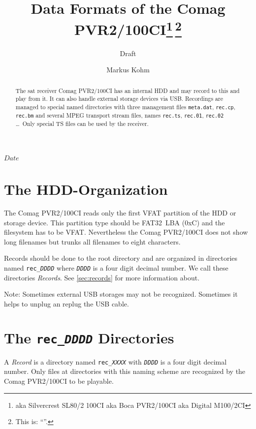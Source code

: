 \documentclass{scrartcl}
\newcommand*{\Comag}{Comag PVR2/100CI\xspace}
\newcommand*{\Silvercrest}{Silvercrest SL80/2 100CI\xspace}
\newcommand*{\Boca}{Boca PVR2/100CI\xspace}
\newcommand*{\Digital}{Digital M100/2CI\xspace}
\begin{document}
\pdfbookmark[1]{\Comag}{title}
\title{Data Formats of the \Comag\footnote{aka
    \Silvercrest aka \Boca aka \Digital}\,\footnote{This is: ``\SVNId''.}}
\subtitle{Draft}
\author{Markus Kohm}
\SVNdate $Date$
\maketitle
\begin{abstract}
  The sat receiver \Comag has an internal HDD and may record to this and play
  from it. It can also handle external storage devices via USB. Recordings are
  managed to special named directories with three management files
  \texttt{meta.dat}, \texttt{rec.cp}, \texttt{rec.bm} and several MPEG
  transport stream files, names \texttt{rec.ts}, \texttt{rec.01},
  \texttt{rec.02} \dots\@\ Only special TS files can be used by the receiver.
\end{abstract}

\tableofcontents

\section{The HDD-Organization}
\label{sec:hdd-organization}

The \Comag reads only the first VFAT partition of the HDD or storage
device. This partition type should be FAT32~LBA (0xC) and the filesystem has
to be VFAT. Nevertheless the \Comag does not show long filenames but trunks
all filenames to eight characters.

Records should be done to the root directory and are organized in directories
named \texttt{rec\_\textit{DDDD}} where \texttt{\textit{DDDD}} is a four digit
decimal number. We call these directories \emph{Records}. See
\autoref{sec:records} for more information about.

Note: Sometimes external USB storages may not be recognized. Sometimes it
helps to unplug an replug the USB cable.

\section{The \texttt{rec\_\textit{DDDD}} Directories}
\label{sec:records}

A \emph{Record} is a directory named \texttt{rec\_\textit{XXXX}} with
\texttt{\textit{DDDD}} is a four digit decimal number. Only files at
directories with this naming scheme are recognized by the \Comag to be
playable.
\end{document}
